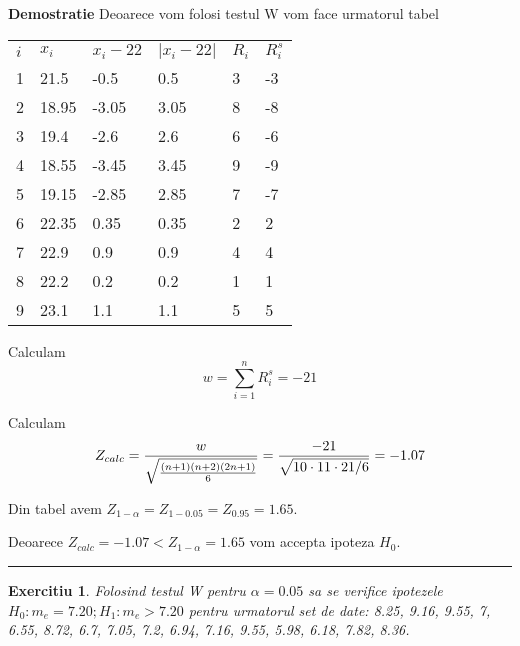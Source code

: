 \documentclass{article}
\newtheorem{exercise}[theorem]{Exercitiu}
\newenvironment{proof}[1][Proof]{\noindent\textbf{Demostratie} }{\ \rule{0.5em}{0.5em}}
\begin{document}
\begin{proof}
Deoarece vom folosi testul W vom face urmatorul tabel

\begin{tabular}{llllll}
$i$ & $x_{i}$ & $x_{i}-22$ & $\left\vert x_{i}-22\right\vert $ & $R_{i}$ & $%
R_{i}^{s}$ \\ 
1 & 21.5 & -0.5 & 0.5 & 3 & -3 \\ 
2 & 18.95 & -3.05 & 3.05 & 8 & -8 \\ 
3 & 19.4 & -2.6 & 2.6 & 6 & -6 \\ 
4 & 18.55 & -3.45 & 3.45 & 9 & -9 \\ 
5 & 19.15 & -2.85 & 2.85 & 7 & -7 \\ 
6 & 22.35 & 0.35 & 0.35 & 2 & 2 \\ 
7 & 22.9 & 0.9 & 0.9 & 4 & 4 \\ 
8 & 22.2 & 0.2 & 0.2 & 1 & 1 \\ 
9 & 23.1 & 1.1 & 1.1 & 5 & 5%
\end{tabular}

Calculam%
\[
w=\sum_{i=1}^{n}R_{i}^{s}=-21
\]

Calculam%
\[
Z_{calc}=\frac{w}{\sqrt{\frac{(n+1)(n+2)(2n+1)}{6}}}=\frac{-21}{\sqrt{%
10\cdot 11\cdot 21/6}}=-1.07
\]

Din tabel avem $Z_{1-\alpha }=Z_{1-0.05}=Z_{0.95}=1.65$.

Deoarece $Z_{calc}=-1.07<Z_{1-\alpha }=1.65$ vom accepta ipoteza $H_{0}.$
\end{proof}

\begin{exercise}
Folosind testul W pentru $\alpha =0.05$ sa se verifice ipotezele $%
H_{0}:m_{e}=7.20;H_{1}:m_{e}>7.20$ pentru urmatorul set de date: 8.25, 9.16,
9.55, 7, 6.55, 8.72, 6.7, 7.05, 7.2, 6.94, 7.16, 9.55, 5.98, 6.18, 7.82,
8.36.
\end{exercise}
\end{document}
